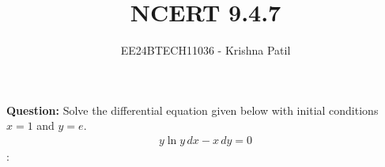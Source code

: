 \documentclass[journal]{IEEEtran}
\begin{document}

\vspace{3cm}

\title{NCERT 9.4.7}
\author{EE24BTECH11036 - Krishna Patil}
{\let\newpage\relax\maketitle}

\renewcommand{\thefigure}{\theenumi}
\renewcommand{\thetable}{\theenumi}
\setlength{\intextsep}{10pt} %

\textbf{Question:} Solve the differential equation given below with initial conditions $ x = 1 $ and $ y = e $.
\begin{align}
	y \ln{y} \, dx - x \, dy = 0
\end{align}
\solution :
\end{document}

